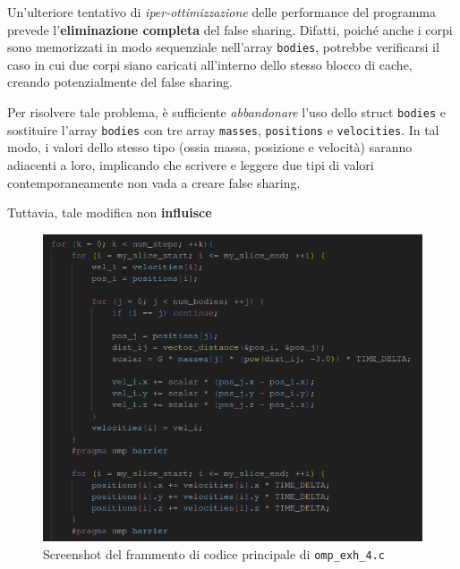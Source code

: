 \documentclass[12pt]{report}
\begin{document}
    Un'ulteriore tentativo di \textit{iper-ottimizzazione} delle performance del programma prevede l'\textbf{eliminazione completa} del false sharing. Difatti, poiché anche i corpi sono memorizzati in modo sequenziale nell'array \texttt{bodies}, potrebbe verificarsi il caso in cui due corpi siano caricati all'interno dello stesso blocco di cache, creando potenzialmente del false sharing.
    
    Per risolvere tale problema, è sufficiente \textit{abbandonare} l'uso dello struct \texttt{bodies} e sostituire l'array \texttt{bodies} con tre array \texttt{masses}, \texttt{positions} e \texttt{velocities}. In tal modo, i valori dello stesso tipo (ossia massa, posizione e velocità) saranno adiacenti a loro, implicando che scrivere e leggere due tipi di valori contemporaneamente non vada a creare false sharing.

    Tuttavia, tale modifica non \textbf{influisce}

    \begin{figure}[H]
        \centering
        \includegraphics[width=\textwidth]{images/omp_exh_4.png}
        \caption{Screenshot del frammento di codice principale di \texttt{omp\_exh\_4.c}}
        \label{fig:omp_exh_4}
    \end{figure}
\end{document}
